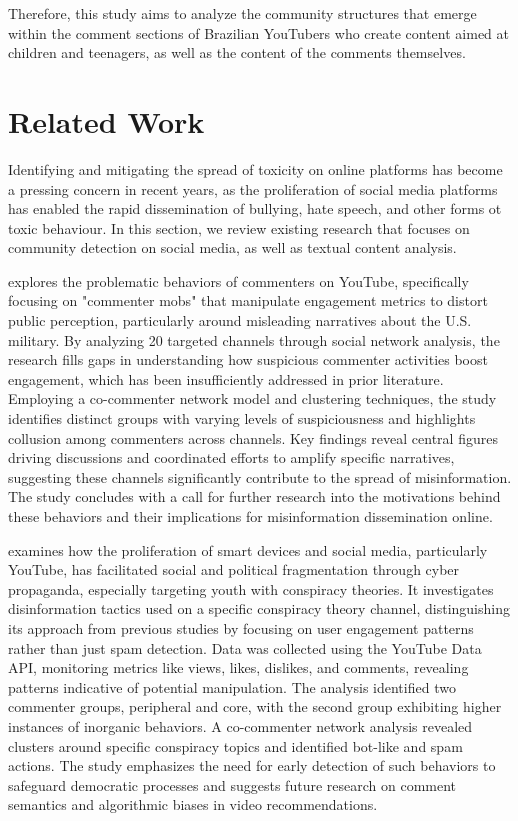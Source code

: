 \documentclass[12pt]{article}
\begin{document}
Therefore, this study aims to analyze the community structures that emerge within the comment 
sections of Brazilian YouTubers who create content aimed at children and teenagers, 
as well as the content of the comments themselves.

\section{Related Work}

Identifying and mitigating the spread of toxicity on online platforms has become a pressing concern 
in recent years, as the proliferation of social media platforms has enabled the rapid dissemination of
bullying, hate speech, and other forms ot toxic behaviour.
In this section, we review existing research that focuses on community detection on social media,
as well as textual content analysis.


\cite{shajari2023} explores the problematic behaviors of 
commenters on YouTube, specifically focusing on "commenter mobs" that manipulate engagement 
metrics to distort public perception, particularly around misleading narratives about the U.S. military. 
By analyzing 20 targeted channels through social network analysis, the research fills gaps in 
understanding how suspicious commenter activities boost engagement, which has been insufficiently 
addressed in prior literature. Employing a co-commenter network model and clustering techniques, 
the study identifies distinct groups with varying levels of suspiciousness and highlights collusion 
among commenters across channels. Key findings reveal central figures driving discussions and 
coordinated efforts to amplify specific narratives, suggesting these channels significantly contribute 
to the spread of misinformation. The study concludes with a call for further research into the 
motivations behind these behaviors and their implications for misinformation dissemination online.


\cite{hussain2018analyzing} examines how the proliferation of smart devices and social media, 
particularly YouTube, has facilitated social and political fragmentation through cyber propaganda,
especially targeting youth with conspiracy theories. 
It investigates disinformation tactics used on a specific conspiracy theory channel,
distinguishing its approach from previous studies by focusing on user engagement patterns rather 
than just spam detection. 
Data was collected using the YouTube Data API, monitoring metrics like views, likes, dislikes, 
and comments, revealing patterns indicative of potential manipulation. 
The analysis identified two commenter groups, peripheral and core, with the second group exhibiting higher 
instances of inorganic behaviors. A co-commenter network analysis revealed clusters around specific 
conspiracy topics and identified bot-like and spam actions. The study emphasizes the need for early 
detection of such behaviors to safeguard democratic processes and suggests future research on 
comment semantics and algorithmic biases in video recommendations.
\end{document}
